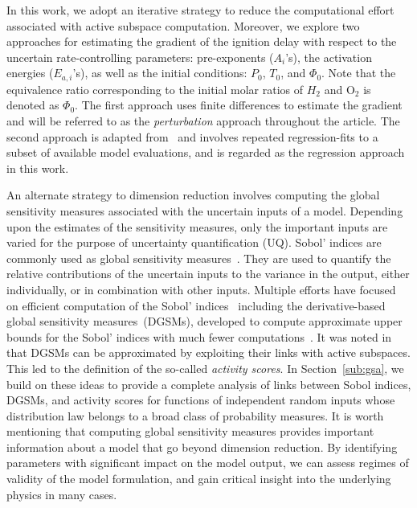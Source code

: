 In this work, we adopt an iterative strategy to reduce the computational effort
associated with active subspace computation. Moreover, we explore two
approaches for estimating the gradient of the ignition delay with respect to
the uncertain rate-controlling parameters: pre-exponents ($A_i$'s), 
the activation energies ($E_{a,i}$'s),
as well as the initial conditions: $P_0$, $T_0$, and $\Phi_0$.
Note that the equivalence ratio corresponding to the initial molar ratios of
$H_2$ and O$_2$ is denoted as $\Phi_0$. The first approach uses finite
differences to estimate the gradient and will be referred to as the
\emph{perturbation} approach throughout the article.  The second approach
is adapted from~\cite[Algorithm 1.2]{Constantine:2015} and involves
repeated regression-fits to a subset of available model evaluations, and is
regarded as the regression approach in this work.

An alternate strategy to dimension reduction involves computing the global
sensitivity measures associated with the uncertain inputs of a model. Depending
upon the estimates of the sensitivity measures, only the important inputs are
varied for the purpose of uncertainty quantification (UQ). Sobol' indices are
commonly used as global sensitivity measures~\cite{Sobol:2001}. They are
used to quantify the relative contributions of the uncertain inputs to the variance
in the output, either individually, or in combination with other inputs. 
Multiple efforts have focused on efficient computation of the Sobol' 
indices~\cite{Sudret:2008,Plischke:2013,Tissot:2015,Li:2016} including the 
derivative-based global sensitivity measures~(DGSMs), developed to
compute approximate upper bounds for the Sobol' indices with much fewer
computations~\cite{Sobol:2009, Lamboni:2013}. It was noted
in~\cite{Diaz:2016,Constantine:2017} that DGSMs can be approximated by
exploiting their links with active subspaces. This led to the definition of the 
so-called \emph{activity scores}. In Section~\ref{sub:gsa}, we build on these
ideas to provide a complete analysis of links between Sobol indices, DGSMs, and
activity scores for functions of independent random inputs whose distribution
law belongs to a broad class of probability measures. 
It is worth mentioning that computing global sensitivity measures provides 
important information about a model that go beyond dimension reduction. By 
identifying parameters with significant impact on the model output, we can assess
regimes of validity of the model formulation, and gain critical insight into the
underlying physics in many cases. 

